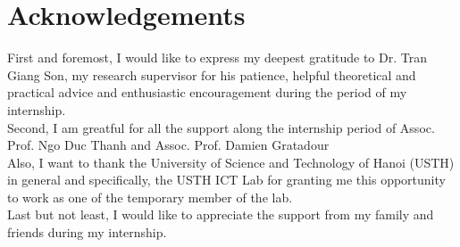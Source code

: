 \chapter*{Acknowledgements}

First and foremost, I would like to express my deepest gratitude to Dr. Tran Giang Son, my research supervisor for his patience, helpful theoretical and practical advice and enthusiastic encouragement during the period of my internship. \\
Second, I am greatful for all the support along the internship period of Assoc. Prof. Ngo Duc Thanh and Assoc. Prof. Damien Gratadour\\
Also, I want to thank the University of Science and Technology of Hanoi (USTH) in general and specifically, the USTH ICT Lab for granting me this opportunity to work as one of the temporary member of the lab. \\
Last but not least, I would like to appreciate the support from my family and friends during my internship. \\
